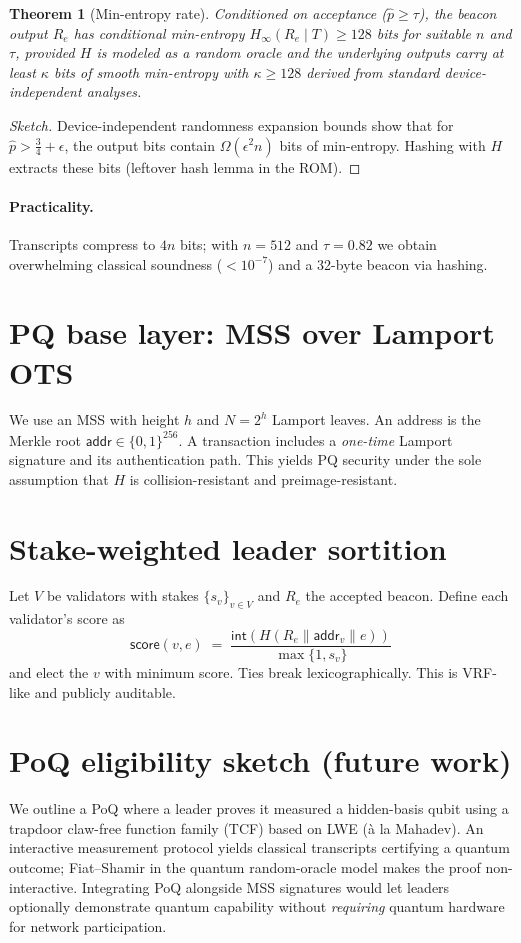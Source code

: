 \documentclass[11pt]{article}
\newtheorem{theorem}{Theorem}
\begin{document}
\begin{theorem}[Min-entropy rate]
\label{thm:minentropy}
Conditioned on acceptance ($\hat{p}\ge\tau$), the beacon output $R_e$ has conditional min-entropy
$H_\infty(R_e\mid T) \ge 128$ bits for suitable $n$ and $\tau$, provided $H$ is modeled as a random oracle and the underlying outputs carry at least $\kappa$ bits of smooth min-entropy with $\kappa\ge 128$ derived from standard device-independent analyses.
\end{theorem}
\begin{proof}[Sketch]
Device-independent randomness expansion bounds show that for $\hat{p}>\tfrac{3}{4}+\epsilon$, the output bits contain $\Omega(\epsilon^2 n)$ bits of min-entropy. Hashing with $H$ extracts these bits (leftover hash lemma in the ROM).
\end{proof}

\paragraph{Practicality.}
Transcripts compress to $4n$ bits; with $n=512$ and $\tau=0.82$ we obtain overwhelming classical soundness ($<10^{-7}$) and a 32-byte beacon via hashing.

\section{PQ base layer: MSS over Lamport OTS}
We use an MSS with height $h$ and $N=2^h$ Lamport leaves.
An address is the Merkle root $\mathsf{addr}\in\{0,1\}^{256}$.
A transaction includes a \emph{one-time} Lamport signature and its authentication path.
This yields PQ security under the sole assumption that $H$ is collision-resistant and preimage-resistant.

\section{Stake-weighted leader sortition}
Let $V$ be validators with stakes $\{s_v\}_{v\in V}$ and $R_e$ the accepted beacon.
Define each validator's score as
\[
\textsf{score}(v,e) \;=\; \frac{\textsf{int}(H(R_e\| \mathsf{addr}_v\|e))}{\max\{1,s_v\}}
\]
and elect the $v$ with minimum score. Ties break lexicographically. This is VRF-like and publicly auditable.

\section{PoQ eligibility sketch (future work)}
We outline a PoQ where a leader proves it measured a hidden-basis qubit using a trapdoor claw-free function family (TCF) based on LWE (à la Mahadev).
An interactive measurement protocol yields classical transcripts certifying a quantum outcome; Fiat--Shamir in the quantum random-oracle model makes the proof non-interactive.
Integrating PoQ alongside MSS signatures would let leaders optionally demonstrate quantum capability without \emph{requiring} quantum hardware for network participation.
\end{document}
